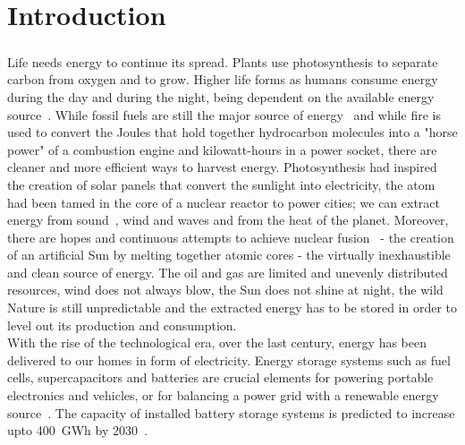 \chapter{Introduction}
\paragraph*{}
Life needs energy to continue its spread. Plants use photosynthesis to separate carbon from oxygen and to grow. Higher life forms as humans consume energy during the day and during the night, being dependent on the available energy source~\cite{energy_consumption_review}. While fossil fuels are still the major source of energy~\cite{energy_sources_review} and while fire is used to convert the Joules that hold together hydrocarbon molecules into a "horse power" of a combustion engine and kilowatt-hours in a power socket, there are cleaner and more efficient ways to harvest energy. Photosynthesis had inspired the creation of solar panels that convert the sunlight into electricity, the atom had been tamed in the core of a nuclear reactor to power cities; we can extract energy from sound~\cite{energy_from_sound}, wind and waves and from the heat of the planet. Moreover, there are hopes and continuous attempts to achieve nuclear fusion~\cite{tokamak_updates} - the creation of an artificial Sun by melting together atomic cores - the virtually inexhaustible and clean source of energy. The oil and gas are limited and unevenly distributed resources, wind does not always blow, the Sun does not shine at night, the wild Nature is still unpredictable and the extracted energy has to be stored in order to level out its production and consumption.\\
With the rise of the technological era, over the last century, energy has been delivered to our homes in form of electricity. Energy storage systems such as fuel cells, supercapacitors and batteries are crucial elements for powering portable electronics and vehicles, or for balancing a power grid with a renewable energy source~\cite{janoschka2012_advmater}. The capacity of installed battery storage systems is predicted to increase upto 400~GWh by 2030~\cite{Figgener_2020}.

